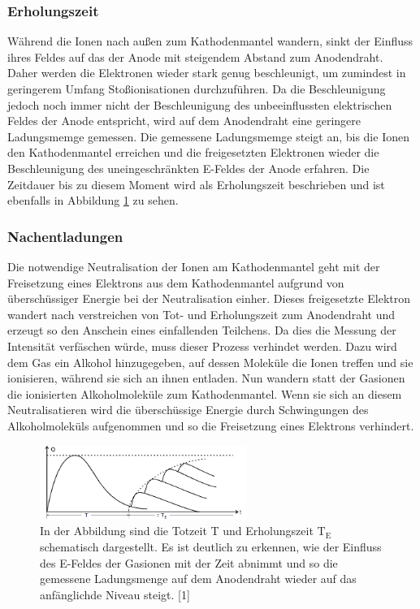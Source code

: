 \documentclass[titlepage = firstcover]{scrartcl}
\begin{document}
            \subsubsection*{Erholungszeit}
                Während die Ionen nach außen zum Kathodenmantel wandern, sinkt der Einfluss ihres Feldes auf das der Anode mit steigendem Abstand zum Anodendraht. Daher werden die Elektronen wieder
                stark genug beschleunigt, um zumindest in geringerem Umfang Stoßionisationen durchzuführen. Da die Beschleunigung jedoch noch immer nicht der Beschleunigung des unbeeinflussten
                elektrischen Feldes der Anode entspricht, wird auf dem Anodendraht eine geringere Ladungsmemge gemessen. Die gemessene Ladungsmemge steigt an, bis die Ionen den Kathodenmantel 
                erreichen und die freigesetzten Elektronen wieder die Beschleunigung des uneingeschränkten E-Feldes der Anode erfahren. Die Zeitdauer bis zu diesem Moment wird als Erholungszeit
                beschrieben und ist ebenfalls in Abbildung \ref{fig:Zeit} zu sehen.

            \subsubsection*{Nachentladungen}
                Die notwendige Neutralisation der Ionen am Kathodenmantel geht mit der Freisetzung eines Elektrons aus dem Kathodenmantel aufgrund von überschüssiger Energie  bei der Neutralisation
                einher. Dieses freigesetzte Elektron wandert nach verstreichen von Tot- und Erholungszeit zum Anodendraht und erzeugt so den Anschein eines einfallenden Teilchens. Da dies die Messung 
                der Intensität verfäschen würde, muss dieser Prozess verhindet werden. Dazu wird dem Gas ein Alkohol hinzugegeben, auf dessen Moleküle die Ionen treffen und sie ionisieren, während sie 
                sich an ihnen entladen. Nun wandern statt der Gasionen die ionisierten Alkoholmoleküle zum Kathodenmantel. Wenn sie sich an diesem Neutralisatieren wird die überschüssige Energie durch
                Schwingungen des Alkoholmoleküls aufgenommen und so die Freisetzung eines Elektrons verhindert. 

                \FloatBarrier

                \begin{figure}[h]
                  \centering
                  \includegraphics[width = 0.6\textwidth]{Bilder/Zeit.png}
                  \caption{In der Abbildung sind die Totzeit T und Erholungszeit $\text{T}_{\text{E}}$ schematisch dargestellt. Es ist deutlich zu erkennen, wie der Einfluss des E-Feldes der Gasionen mit der Zeit abnimmt und so die gemessene Ladungsmenge auf dem Anodendraht wieder auf das anfänglichde Niveau steigt. [1]}
                  \label{fig:Zeit}
                \end{figure}
\end{document}

